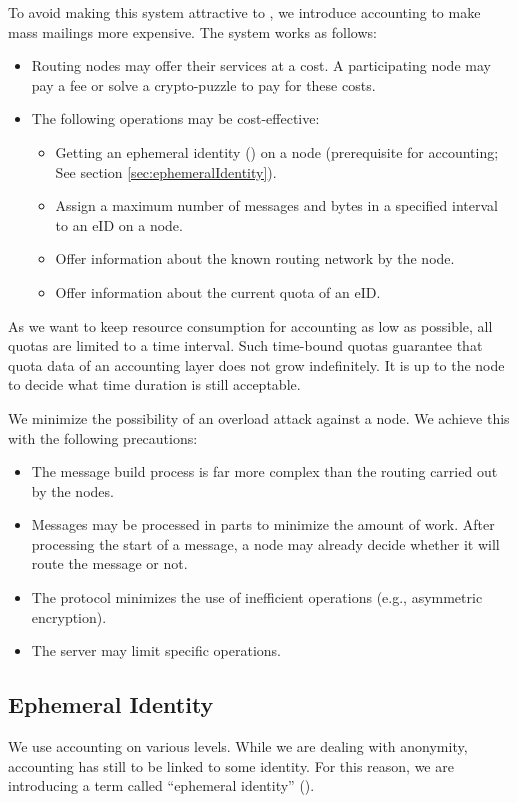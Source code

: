 To avoid making this system attractive to , we introduce accounting to make mass mailings more expensive. The system works as follows:
\begin{itemize}
	\item Routing nodes may offer their services at a cost. A participating node may pay a fee or solve a crypto-puzzle to pay for these costs.
	\item The following operations may be cost-effective:
	\begin{itemize}
		\item Getting an ephemeral identity () on a node (prerequisite for accounting; See section \ref{sec:ephemeralIdentity}).
		\item Assign a maximum number of messages and bytes in a specified interval to an eID on a node.
		\item Offer information about the known routing network by the node.
		\item Offer information about the current quota of an eID.
	\end{itemize}
\end{itemize}
As we want to keep resource consumption for accounting as low as possible, all quotas are limited to a time interval. Such time-bound quotas guarantee that quota data of an accounting layer does not grow indefinitely. It is up to the node to decide what time duration is still acceptable.

We minimize the possibility of an overload attack against a node. We achieve this with the following precautions:
\begin{itemize}
	\item The message build process is far more complex than the routing carried out by the nodes.
	\item Messages may be processed in parts to minimize the amount of work. After processing the start of a message, a node may already decide whether it will route the message or not.
	\item The protocol minimizes the use of inefficient operations (e.g., asymmetric encryption).
	\item The server may limit specific operations.
\end{itemize}

\subsection{Ephemeral Identity\label{sec:ephemeralIdentity}}
We use accounting on various levels. While we are dealing with anonymity, accounting has still to be linked to some identity. For this reason, we are introducing a term called ``ephemeral identity'' ().

